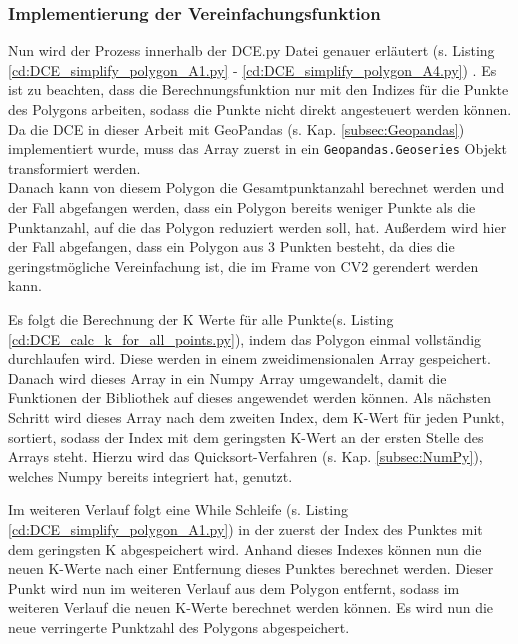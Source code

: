 {	\subsubsection{Implementierung der Vereinfachungsfunktion \label{impl:DCE_SimplyfierFunc}}

	Nun wird der Prozess innerhalb der DCE.py Datei genauer erläutert \ifimportant (s. Listing \ref{cd:DCE_simplify_polygon_A1.py} - \ref{cd:DCE_simplify_polygon_A4.py}) \fi. Es ist zu beachten, dass die Berechnungsfunktion nur mit den Indizes für die Punkte des Polygons arbeiten, sodass die Punkte nicht direkt angesteuert werden können. Da die DCE in dieser Arbeit mit GeoPandas (s. Kap. \ref{subsec:Geopandas}) implementiert wurde, muss das Array zuerst in ein \lstinline|Geopandas.Geoseries| Objekt transformiert werden. \\
	Danach kann von diesem Polygon die Gesamtpunktanzahl berechnet werden und der Fall abgefangen werden, dass ein Polygon bereits weniger Punkte als die Punktanzahl, auf die das Polygon reduziert werden soll, hat. Außerdem wird hier der Fall abgefangen, dass ein Polygon aus 3 Punkten besteht, da dies die geringstmögliche Vereinfachung ist, die im Frame von CV2 gerendert werden kann. \\
	\ifimportant
	
	\fi	Es folgt die Berechnung der K Werte für alle Punkte\ifimportant(s. Listing \ref{cd:DCE_calc_k_for_all_points.py})\fi, indem das Polygon einmal vollständig durchlaufen wird. Diese werden in einem zweidimensionalen Array gespeichert. Danach wird dieses Array in ein Numpy Array umgewandelt, damit die Funktionen der Bibliothek auf dieses angewendet werden können. Als nächsten Schritt wird dieses Array nach dem zweiten Index, dem K-Wert für jeden Punkt, sortiert, sodass der Index mit dem geringsten K-Wert an der ersten Stelle des Arrays steht. Hierzu wird das Quicksort-Verfahren (s. Kap. \ref{subsec:NumPy}), welches Numpy bereits integriert hat, genutzt. \\
	\ifimportant
	
	\fi
	Im weiteren Verlauf folgt eine While Schleife \ifimportant(s. Listing \ref{cd:DCE_simplify_polygon_A1.py}) \fi in der zuerst der Index des Punktes mit dem geringsten K abgespeichert wird. Anhand dieses Indexes können nun die neuen K-Werte nach einer Entfernung dieses Punktes berechnet werden. Dieser Punkt wird nun im weiteren Verlauf aus dem Polygon entfernt, sodass im weiteren Verlauf die neuen K-Werte berechnet werden können. Es wird nun die neue verringerte Punktzahl des Polygons abgespeichert. \\
}
